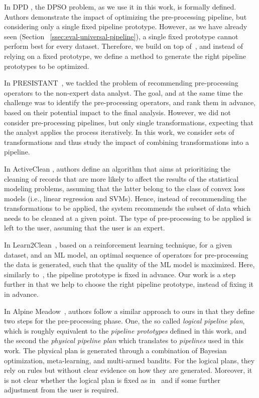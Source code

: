 In DPD \cite{Quemy20InfSystems}, the DPSO problem, as we use it in this work, is formally defined. Authors demonstrate the impact of optimizing the pre-processing pipeline, but considering only a single fixed pipeline prototype. %
However, as we have already seen (Section~
\ref{ssec:eval-universal-pipeline}), a single fixed prototype cannot perform best for every dataset. Therefore, we build on top of~\cite{Quemy20InfSystems}, and instead of relying on a fixed prototype, we define a method to generate the right pipeline prototypes to be optimized.

In PRESISTANT~\cite{presistant18CSI,presistant18CAISE,presistant19DKE}, we tackled the problem of recommending pre-processing operators to the non-expert data analyst. The goal, and at the same time the challenge was to identify the pre-processing operators, and rank them in advance, based on their potential impact to the final analysis. However, we did not consider pre-processing pipelines, but only single transformations, expecting that the analyst applies the process iteratively. In this work, we consider sets of transformations and thus study the impact of combining transformations into a pipeline. 

In ActiveClean \cite{ActiveClean16PVLDB}, authors define an algorithm that aims at prioritizing the cleaning of records that are more likely to affect the results of the statistical modeling problems, assuming that the latter belong to the class of convex loss models (i.e., linear regression and SVMs). Hence, instead of recommending the transformations to be applied, the system recommends the subset of data which needs to be cleaned at a given point. The type of pre-processing to be applied is left to the user, assuming that the user is an expert. 

In Learn2Clean~\cite{Berti19WWW}, based on a reinforcement learning technique, for a given dataset, and an ML model, an optimal sequence of operators for pre-processing the data is generated,
such that the quality of the ML model is maximized. Here, similarly to~\cite{Quemy20InfSystems}, the pipeline prototype is fixed in advance. Our work is a step further in that we help to choose the right pipeline prototype, instead of fixing it in advance. 

In Alpine Meadow~\cite{Shang19SIGMOD}, authors follow a similar approach to ours in that they define two steps for the pre-processing phase. One, the so called \textit{logical pipeline plan}, which is roughly equivalent to the \textit{pipeline prototypes} defined in this work, and the second the \textit{physical pipeline plan} which translates to \textit{pipelines} used in this work. The physical plan is generated through a combination of Bayesian optimization, meta-learning, and multi-armed bandits. For the logical plans, they rely on rules but without clear evidence on how they are generated. Moreover, it is not clear whether the logical plan is fixed as in~\cite{Quemy20InfSystems} and if some further adjustment from the user is required. 

